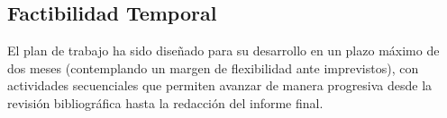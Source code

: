 \subsection{Factibilidad Temporal}
El plan de trabajo ha sido diseñado para su desarrollo en un plazo máximo de dos meses (contemplando un margen de flexibilidad ante imprevistos), con actividades secuenciales que permiten avanzar de manera progresiva desde la revisión bibliográfica hasta la redacción del informe final.